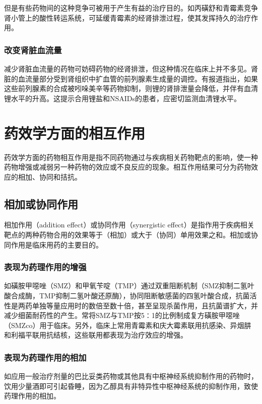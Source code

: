 但是有些药物间的这种竞争可被用于产生有益的治疗目的。如丙磺舒和青霉素竞争肾小管上的酸性转运系统，可延缓青霉素的经肾排泄过程，使其发挥持久的治疗作用。

\subsubsection{改变肾脏血流量}

减少肾脏血流量的药物可妨碍药物的经肾排泄，但这种情况在临床上并不多见。肾脏的血流量部分受到肾组织中扩血管的前列腺素生成量的调控。有报道指出，如果这些前列腺素的合成被吲哚美辛等药物抑制，则锂的肾排泄量会降低，并伴有血清锂水平的升高。这提示合用锂盐和NSAIDs的患者，应密切监测血清锂水平。

\section{药效学方面的相互作用}

药效学方面的药物相互作用是指不同药物通过与疾病相关药物靶点的影响，使一种药物增强或减弱另一种药物的效应或不良反应的现象。相互作用结果可分为药物效应的相加、协同和拮抗。

\subsection{相加或协同作用}

相加作用（addition effect）或协同作用（synergistic
effect）是指作用于疾病相关靶点的两种药物合用的效果等于（相加）或大于（协同）单用效果之和。相加或协同作用是临床用药的主要目的。

\subsubsection{表现为药理作用的增强}

如磺胺甲噁唑（SMZ）和甲氧苄啶（TMP）通过双重阻断机制（SMZ抑制二氢叶酸合成酶，TMP抑制二氢叶酸还原酶），协同阻断敏感菌的四氢叶酸合成，抗菌活性是两药单独等量应用时的数倍至数十倍，甚至呈现杀菌作用，且抗菌谱扩大，并减少细菌耐药性的产生。常将SMZ与TMP按5∶1的比例制成复方磺胺甲噁唑（SMZco）用于临床。另外，临床上常用青霉素和庆大霉素联用抗感染、异烟肼和利福平联用抗结核，这些联用都表现为治疗效应的增强。

\subsubsection{表现为药理作用的相加}

如应用一般治疗剂量的巴比妥类药物或其他具有中枢神经系统抑制作用的药物时，饮用少量酒即可引起昏睡，因为乙醇具有非特异性中枢神经系统的抑制作用，致使药理作用的相加。


